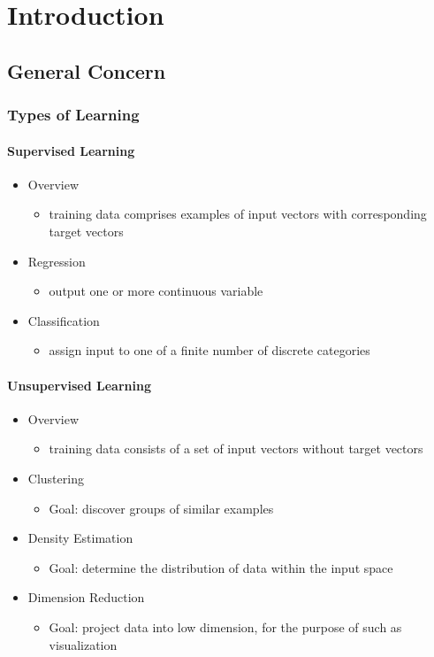 \chapter{Introduction}

\section{General Concern}
\subsection{Types of Learning}

\subsubsection{Supervised Learning}
\begin{itemize}
\item Overview
	\begin{itemize}
	\item training data comprises examples of input vectors with corresponding target vectors
	\end{itemize}
\item Regression
	\begin{itemize}
	\item output one or more continuous variable
	\end{itemize}

\item Classification
	\begin{itemize}
	\item assign input to one of a finite number of discrete categories
	\end{itemize}
\end{itemize}

\subsubsection{Unsupervised Learning}
\begin{itemize}
\item Overview
	\begin{itemize}
	\item training data consists of a set of input
	vectors without target vectors
	\end{itemize}
\item Clustering
	\begin{itemize}
	\item Goal: discover groups of similar examples
	\end{itemize}
\item Density Estimation
	\begin{itemize}
	\item Goal: determine the distribution of data within the input space
	\end{itemize}
\item Dimension Reduction
	\begin{itemize}
	\item Goal: project data into low dimension, for the purpose of such as visualization
	\end{itemize}
\end{itemize}

